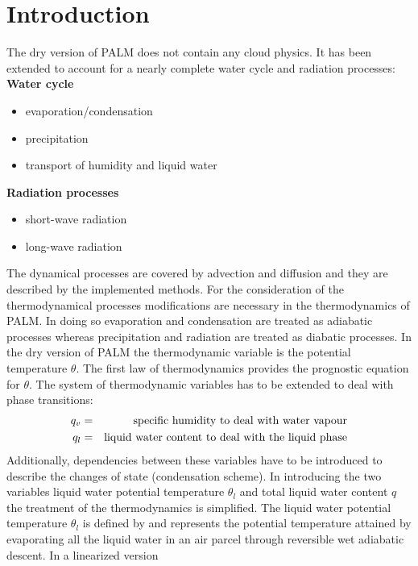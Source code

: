 \documentclass[11pt,a4paper]{scrartcl}
\begin{document}
\section{Introduction}
The dry version of PALM does not contain any cloud physics. It has been extended 
to account for a nearly complete water cycle and radiation processes:
\vspace{0.2cm}
\newline
{\bf\textsf{Water cycle}}
\begin{itemize}
 \item evaporation/condensation
 \item precipitation
 \item transport of humidity and liquid water 
\end{itemize}
{\bf\textsf{Radiation processes}}
\begin{itemize}
 \item short-wave radiation
 \item long-wave radiation
\end{itemize}
The dynamical processes are covered by advection and diffusion and they are described by the implemented methods. For the consideration of the
thermodynamical processes modifications are necessary in the thermodynamics of PALM. In doing so evaporation and condensation are treated as 
adiabatic processes whereas precipitation and radiation are treated as diabatic processes. In the dry version of PALM the thermodynamic variable 
is the potential temperature $\theta$. The first law of thermodynamics provides the prognostic equation 
for $\theta$. The system of thermodynamic variables has to be extended to deal with phase transitions:
\begin{eqnarray*}
 q_{v} & = &\textnormal{specific humidity to deal with water vapour} \\
 q_{l} & = &\textnormal{liquid water content to deal with the liquid phase}
\end{eqnarray*}
Additionally, dependencies between these variables have to be introduced to describe the changes of state (condensation scheme).
\newline
In introducing the two variables liquid water potential temperature $\theta_{l}$ and total liquid water content $q$ the treatment of the 
thermodynamics is simplified. The liquid water potential temperature $\theta_{l}$ is defined by \cite{betts73} and represents the potential 
temperature attained by evaporating all the liquid water in an air parcel through reversible wet adiabatic descent. In a linearized version 
\end{document}
